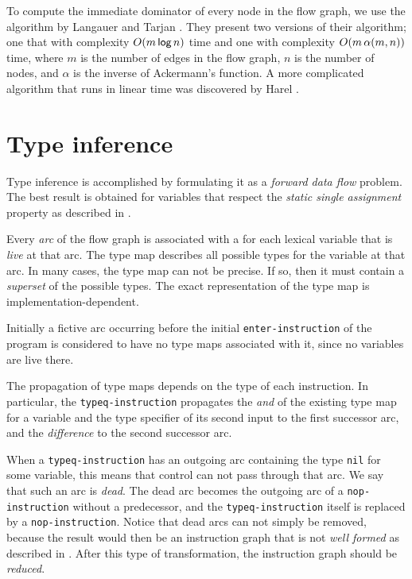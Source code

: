 To compute the immediate dominator of every node in the flow graph, we
use the algorithm by Langauer and Tarjan
\cite{Lengauer:1979:FAF:357062.357071}.  They present two versions of
their algorithm; one that with complexity
$O(m \thinspace\textsf{log}\thinspace n)$ time and one with complexity
$O(m \thinspace\alpha (m, n))$ time, where $m$ is the number of edges
in the flow graph, $n$ is the number of nodes, and $\alpha$ is the
inverse of Ackermann's function.  A more complicated algorithm that
runs in linear time was discovered by Harel
\cite{Harel:1985:LAF:22145.22166}.

\section{Type inference}

Type inference is accomplished by formulating it as a \emph{forward
  data flow} problem.  The best result is obtained for variables that
respect the \emph{static single assignment} property as described in
. 

Every \emph{arc} of the flow graph is associated with a  for each lexical variable that is \emph{live} at that arc.  The
type map describes all possible types for the variable at that arc.
In many cases, the type map can not be precise.  If so, then it must
contain a \emph{superset} of the possible types.  The exact
representation of the type map is implementation-dependent. 

Initially a fictive arc occurring before the initial
\texttt{enter-instruction} of the program is considered to have no
type maps associated with it, since no variables are live there.  

The propagation of type maps depends on the type of each instruction.
In particular, the \texttt{typeq-instruction} propagates the
\emph{and} of the existing type map for a variable and the type
specifier of its second input to the first successor arc, and the
\emph{difference} to the second successor arc.  

When a \texttt{typeq-instruction} has an outgoing arc containing the
type \texttt{nil} for some variable, this means that control can not
pass through that arc.  We say that such an arc is \emph{dead}. 
The dead arc becomes the outgoing arc of a
\texttt{nop-instruction} without a predecessor, and the
\texttt{typeq-instruction} itself is replaced by a
\texttt{nop-instruction}.%
Notice that dead arcs can not simply be removed, because the result
would then be an instruction graph that is not \emph{well formed} as
described in .  After this type of transformation,
the instruction graph should be
\emph{reduced}.  

